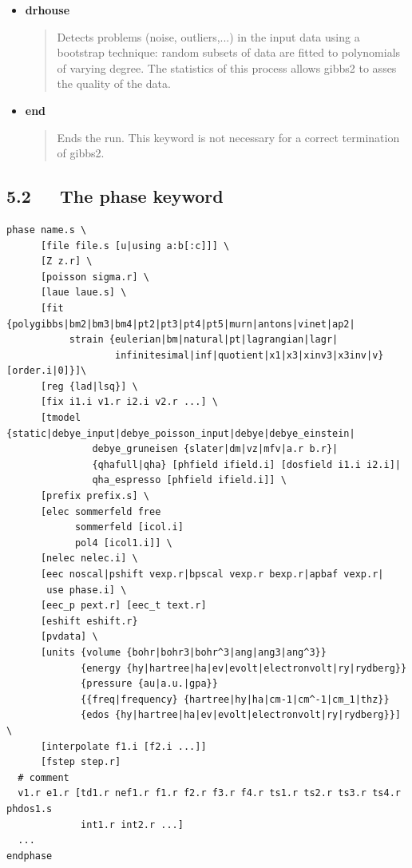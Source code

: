 \documentclass[a4paper]{article}
\begin{document}
\begin{itemize}
\begin{description}
\end{description}

\item \textbf{drhouse}
%
\begin{quote}

Detects problems (noise, outliers,...) in the input data using a
bootstrap technique: random subsets of data are fitted to
polynomials of varying degree. The statistics of this process
allows gibbs2 to asses the quality of the data.

\end{quote}

\item \textbf{end}
%
\begin{quote}

Ends the run. This keyword is not necessary for a correct
termination of gibbs2.

\end{quote}

\end{itemize}


\subsection{5.2~~~The phase keyword%
  \label{the-phase-keyword}%
}
%
\gibbslist
\begin{lstlisting}
phase name.s \
      [file file.s [u|using a:b[:c]]] \
      [Z z.r] \
      [poisson sigma.r] \
      [laue laue.s] \
      [fit {polygibbs|bm2|bm3|bm4|pt2|pt3|pt4|pt5|murn|antons|vinet|ap2|
           strain {eulerian|bm|natural|pt|lagrangian|lagr|
                   infinitesimal|inf|quotient|x1|x3|xinv3|x3inv|v} [order.i|0]}]\
      [reg {lad|lsq}] \
      [fix i1.i v1.r i2.i v2.r ...] \
      [tmodel {static|debye_input|debye_poisson_input|debye|debye_einstein|
               debye_gruneisen {slater|dm|vz|mfv|a.r b.r}|
               {qhafull|qha} [phfield ifield.i] [dosfield i1.i i2.i]|
               qha_espresso [phfield ifield.i]] \
      [prefix prefix.s] \
      [elec sommerfeld free
            sommerfeld [icol.i]
            pol4 [icol1.i]] \
      [nelec nelec.i] \
      [eec noscal|pshift vexp.r|bpscal vexp.r bexp.r|apbaf vexp.r|
       use phase.i] \
      [eec_p pext.r] [eec_t text.r]
      [eshift eshift.r}
      [pvdata] \
      [units {volume {bohr|bohr3|bohr^3|ang|ang3|ang^3}}
             {energy {hy|hartree|ha|ev|evolt|electronvolt|ry|rydberg}}
             {pressure {au|a.u.|gpa}}
             {{freq|frequency} {hartree|hy|ha|cm-1|cm^-1|cm_1|thz}}
             {edos {hy|hartree|ha|ev|evolt|electronvolt|ry|rydberg}}] \
      [interpolate f1.i [f2.i ...]]
      [fstep step.r]
  # comment
  v1.r e1.r [td1.r nef1.r f1.r f2.r f3.r f4.r ts1.r ts2.r ts3.r ts4.r phdos1.s
             int1.r int2.r ...]
  ...
endphase
\end{lstlisting}
\end{document}
